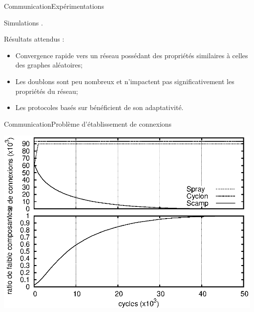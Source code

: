 \begin{frame}{Communication}{Expérimentations}

  Simulations \PEERSIM.
  
  \vspace{0.5cm}

  Résultats attendus :
  \begin{itemize}
  \item Convergence rapide vers un réseau possédant des propriétés similaires à
    celles des graphes aléatoires;
  \item Les doublons sont peu nombreux et n'impactent pas significativement les
    propriétés du réseau;
  \item Les protocoles basés sur \SPRAY bénéficient de son adaptativité.
  \end{itemize}

\end{frame}


\begin{frame}{Communication}{Problème d'établissement de connexions}

  \begin{center}
    \includegraphics[width=1\textwidth]{img/network/degen.eps}
  \end{center}

\end{frame}


